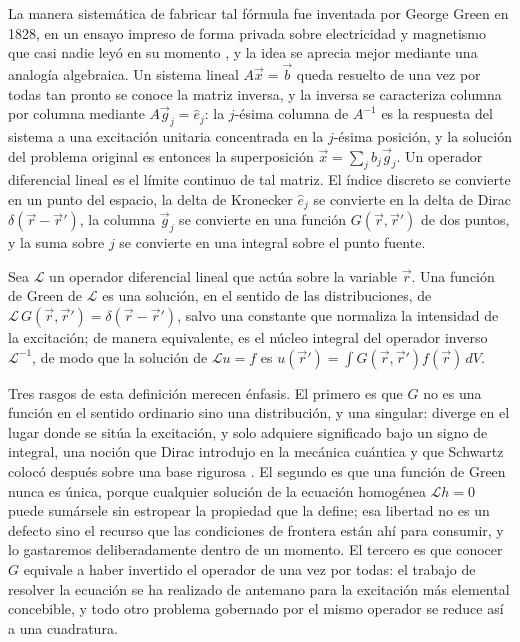 		La manera sistemática de fabricar tal fórmula fue inventada por George Green en 1828, en un ensayo impreso de forma privada sobre electricidad y magnetismo que casi nadie leyó en su momento \citep{green1828essay}, y la idea se aprecia mejor mediante una analogía algebraica. Un sistema lineal $A\vec{x} = \vec{b}$ queda resuelto de una vez por todas tan pronto se conoce la matriz inversa, y la inversa se caracteriza columna por columna mediante $A\vec{g}_{j} = \hat{e}_{j}$: la $j$-ésima columna de $A^{-1}$ es la respuesta del sistema a una excitación unitaria concentrada en la $j$-ésima posición, y la solución del problema original es entonces la superposición $\vec{x} = \sum_{j} b_{j}\vec{g}_{j}$. Un operador diferencial lineal es el límite continuo de tal matriz. El índice discreto se convierte en un punto del espacio, la delta de Kronecker $\hat{e}_{j}$ se convierte en la delta de Dirac $\delta(\vec{r}-\vec{r}')$, la columna $\vec{g}_{j}$ se convierte en una función $G(\vec{r},\vec{r}')$ de dos puntos, y la suma sobre $j$ se convierte en una integral sobre el punto fuente.

		\begin{myDef}
			Sea $\mathcal{L}$ un operador diferencial lineal que actúa sobre la variable $\vec{r}$. Una función de Green de $\mathcal{L}$ es una solución, en el sentido de las distribuciones, de $\mathcal{L}\,G(\vec{r},\vec{r}') = \delta(\vec{r}-\vec{r}')$, salvo una constante que normaliza la intensidad de la excitación; de manera equivalente, es el núcleo integral del operador inverso $\mathcal{L}^{-1}$, de modo que la solución de $\mathcal{L}u = f$ es $u(\vec{r}') = \int G(\vec{r},\vec{r}')f(\vec{r})\,dV$.
		\end{myDef}

		Tres rasgos de esta definición merecen énfasis. El primero es que $G$ no es una función en el sentido ordinario sino una distribución, y una singular: diverge en el lugar donde se sitúa la excitación, y solo adquiere significado bajo un signo de integral, una noción que Dirac introdujo en la mecánica cuántica \citep{dirac1930principles} y que Schwartz colocó después sobre una base rigurosa \citep{schwartz1950theorie}. El segundo es que una función de Green nunca es única, porque cualquier solución de la ecuación homogénea $\mathcal{L}h = 0$ puede sumársele sin estropear la propiedad que la define; esa libertad no es un defecto sino el recurso que las condiciones de frontera están ahí para consumir, y lo gastaremos deliberadamente dentro de un momento. El tercero es que conocer $G$ equivale a haber invertido el operador de una vez por todas: el trabajo de resolver la ecuación se ha realizado de antemano para la excitación más elemental concebible, y todo otro problema gobernado por el mismo operador se reduce así a una cuadratura.

